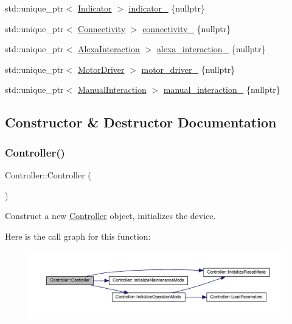 \begin{DoxyCompactItemize}
std\+::unique\+\_\+ptr$<$ \hyperlink{classIndicator}{Indicator} $>$ \hyperlink{classController_a2791727e2f12697523c0f118f1a75829}{indicator\+\_\+} \{nullptr\}
\item 
std\+::unique\+\_\+ptr$<$ \hyperlink{classConnectivity}{Connectivity} $>$ \hyperlink{classController_a921bbc5298098d7633725017a31a78ce}{connectivity\+\_\+} \{nullptr\}
\item 
std\+::unique\+\_\+ptr$<$ \hyperlink{classAlexaInteraction}{Alexa\+Interaction} $>$ \hyperlink{classController_ad3ff592d3aa9d0af95356dbfbc01c52f}{alexa\+\_\+interaction\+\_\+} \{nullptr\}
\item 
std\+::unique\+\_\+ptr$<$ \hyperlink{classMotorDriver}{Motor\+Driver} $>$ \hyperlink{classController_adae82fee20509b294c89c56606ce0d72}{motor\+\_\+driver\+\_\+} \{nullptr\}
\item 
std\+::unique\+\_\+ptr$<$ \hyperlink{classManualInteraction}{Manual\+Interaction} $>$ \hyperlink{classController_af57e2a2524af7626fd9d4bcabc1aa826}{manual\+\_\+interaction\+\_\+} \{nullptr\}
\end{DoxyCompactItemize}


\subsection{Constructor \& Destructor Documentation}
\mbox{\label{classController_a95c56822d667e94b031451729ce069a9}} 
\subsubsection{\texorpdfstring{Controller()}{Controller()}}
{\footnotesize\ttfamily Controller\+::\+Controller (\begin{DoxyParamCaption}{ }\end{DoxyParamCaption})}



Construct a new \hyperlink{classController}{Controller} object, initializes the device. 

Here is the call graph for this function\+:
\nopagebreak
\begin{figure}[H]
\begin{center}
\leavevmode
\includegraphics[width=350pt]{classController_a95c56822d667e94b031451729ce069a9_cgraph}
\end{center}
\end{figure}
\mbox{\label{classController_a0ab87934c4f7a266cfdb86e0f36bc1b5}} 
